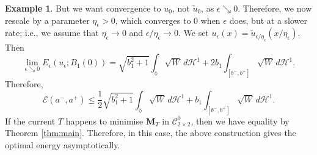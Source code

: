 \documentclass[a4paper]{article}
\newcommand{\Ha}{\mathcal{H}}
\newcommand{\M}{\mathbf{M}}
\newcommand{\ncrt}{\mathcal{C}}
\theoremstyle{definition}
\newtheorem{example}[theorem]{Example}
\theoremstyle{remark}
\begin{document}
\begin{example}
But we want convergence to $u_0$, not $\tilde{u}_0$, as $\epsilon \searrow 0$.
Therefore, we now rescale by a parameter $\eta_\epsilon > 0$, which converges to $0$ when $\epsilon$
does, but at a slower rate; i.e., we assume that $\eta_\epsilon \to 0$ and $\epsilon/\eta_\epsilon \to 0$.
We set $u_\epsilon(x) = \tilde{u}_{\epsilon/\eta_\epsilon}(x/\eta_\epsilon)$. Then
\[
\lim_{\epsilon \searrow 0} E_\epsilon(u_\epsilon; B_1(0)) = \sqrt{b_1^2 + 1} \int_\lozenge \sqrt{W} \, d\Ha^1 + 2b_1 \int_{[b^-, b^+]} \sqrt{W} \, d\Ha^1.
\]
Therefore,
\[
\mathcal{E}(a^-, a^+) \le \frac{1}{2} \sqrt{b_1^2 + 1} \int_\lozenge \sqrt{W} \, d\Ha^1 + b_1 \int_{[b^-, b^+]} \sqrt{W} \, d\Ha^1.
\]
If the current $T$ happens to minimise $\M_T$ in $\ncrt_{2 \times 2}^0$, then we have equality
by Theorem \ref{thm:main}. Therefore, in this case, the above construction gives the optimal
energy asymptotically.
\end{example}
\end{document}

